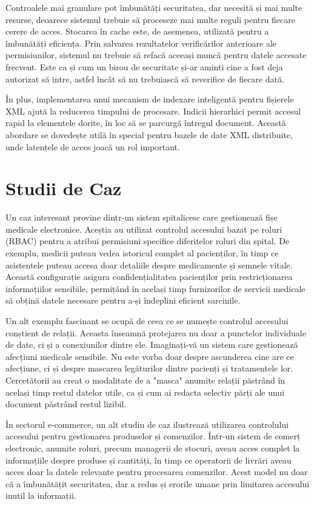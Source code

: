 \documentclass[runningheads]{llncs}
\begin{document}
\begin{spacing}{1.5}
Controalele mai granulare pot îmbunătăți securitatea, dar necesită și mai multe resurse, deoarece sistemul trebuie să proceseze mai multe reguli pentru fiecare cerere de acces. Stocarea în cache este, de asemenea, utilizată pentru a îmbunătăți eficiența. Prin salvarea rezultatelor verificărilor anterioare ale permisiunilor, sistemul nu trebuie să refacă aceeași muncă pentru datele accesate frecvent. Este ca și cum un birou de securitate și-ar aminti cine a fost deja autorizat să intre, astfel încât să nu trebuiască să reverifice de fiecare dată.

În plus, implementarea unui mecanism de indexare inteligentă pentru fișierele XML ajută la reducerea timpului de procesare. Indicii hierarhici permit accesul rapid la elementele dorite, în loc să se parcurgă întregul document. Această abordare se dovedește utilă în special pentru bazele de date XML distribuite, unde latențele de acces joacă un rol important.

\section{Studii de Caz}
Un caz interesant provine dintr-un sistem spitalicesc care gestionează fișe medicale electronice. Aceștia au utilizat controlul accesului bazat pe roluri (RBAC) pentru a atribui permisiuni specifice diferitelor roluri din spital. De exemplu, medicii puteau vedea istoricul complet al pacienților, în timp ce asistentele puteau accesa doar detaliile despre medicamente și semnele vitale. Această configurație asigura confidențialitatea pacienților prin restricționarea informațiilor sensibile, permițând în același timp furnizorilor de servicii medicale să obțină datele necesare pentru a-și îndeplini eficient sarcinile.

Un alt exemplu fascinant se ocupă de ceea ce se numește controlul accesului conștient de relații. Aceasta înseamnă protejarea nu doar a punctelor individuale de date, ci și a conexiunilor dintre ele. Imaginați-vă un sistem care gestionează afecțiuni medicale sensibile. Nu este vorba doar despre ascunderea cine are ce afecțiune, ci și despre mascarea legăturilor dintre pacienți și tratamentele lor. Cercetătorii au creat o modalitate de a "masca" anumite relații păstrând în același timp restul datelor utile, ca și cum ai redacta selectiv părți ale unui document păstrând restul lizibil.

În sectorul e-commerce, un alt studiu de caz ilustrează utilizarea controlului accesului pentru gestionarea produselor și comenzilor. Într-un sistem de comerț electronic, anumite roluri, precum managerii de stocuri, aveau acces complet la informațiile despre produse și cantități, în timp ce operatorii de livrări aveau acces doar la datele relevante pentru procesarea comenzilor. Acest model nu doar că a îmbunătățit securitatea, dar a redus și erorile umane prin limitarea accesului inutil la informații.


\end{spacing}
\end{document}
